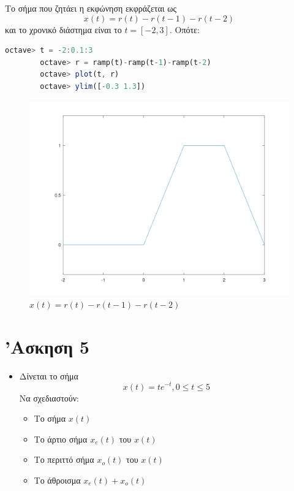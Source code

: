 \documentclass{article}
\begin{document}
Το σήμα που ζητάει η εκφώνηση εκφράζεται ως
\[x(t) = r(t) - r(t-1) - r(t-2)\]
και το χρονικό διάστημα είναι το $t = [-2,3]$. Οπότε:
\begin{lstlisting}[language=octave]
        octave> t = -2:0.1:3
        octave> r = ramp(t)-ramp(t-1)-ramp(t-2)
        octave> plot(t, r)
        octave> ylim([-0.3 1.3])
\end{lstlisting}

\begin{figure}[H]
        \centering
        \includegraphics[width=\linewidth]{res/fig7.png}
        \caption{$x(t) = r(t) - r(t-1) - r(t-2)$}
\end{figure}

\section{'Ασκηση 5}

\begin{itemize}
        \item Δίνεται το σήμα
                \[x(t) = te^{-t}, 0 \leq t \leq 5\]
                Να σχεδιαστούν:
        \begin{itemize}
                \item Το σήμα $x(t)$
                \item Το άρτιο σήμα $x_e(t)$ του $x(t)$
                \item Το περιττό σήμα $x_o(t)$ του $x(t)$
                \item Το άθροισμα $x_e(t) + x_o(t)$
        \end{itemize}
\end{itemize}
\end{document}
